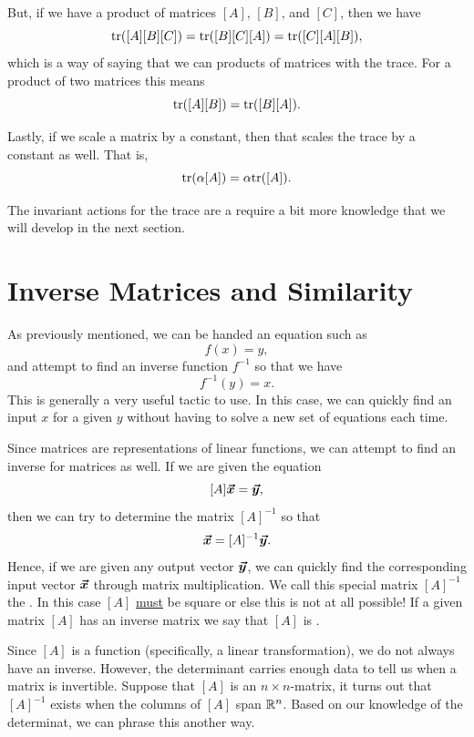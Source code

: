         But, if we have a product of matrices $[A]$, $[B]$, and $[C]$, then we have
        \[
        \mathrm{tr}([A][B][C])=\mathrm{tr}([B][C][A])=\mathrm{tr}([C][A][B]),
        \]
        which is a way of saying that we can  products of matrices with the trace. For a product of two matrices this means
        \[
        \mathrm{tr}([A][B])=\mathrm{tr}([B][A]).
        \]
        
        Lastly, if we scale a matrix by a constant, then that scales the trace by a constant as well. That is,
        \[
        \mathrm{tr}(\alpha[A])=\alpha \mathrm{tr}([A]).
        \]
        
        The invariant actions for the trace are a require a bit more knowledge that we will develop in the next section.
        
    \section{Inverse Matrices and Similarity }
        As previously mentioned, we can be handed an equation such as
        \[
        f(x)=y,
        \]
        and attempt to find an inverse function $f^{-1}$ so that we have
        \[
        f^{-1}(y)=x.
        \]
        This is generally a very useful tactic to use.  In this case, we can quickly find an input $x$ for a given $y$ without having to solve a new set of equations each time.
        
        Since matrices are representations of linear functions, we can attempt to find an inverse for matrices as well.  If we are given the equation
        \[
        [A]\boldsymbol{\boldsymbol{\vec{x}}}=\boldsymbol{\boldsymbol{\vec{y}}},
        \]
        then we can try to determine the matrix $[A]^{-1}$ so that
        \[
        \boldsymbol{\boldsymbol{\vec{x}}} = [A]^{-1}\boldsymbol{\boldsymbol{\vec{y}}}.
        \]
        Hence, if we are given any output vector $\boldsymbol{\boldsymbol{\vec{y}}}$, we can quickly find the corresponding input vector $\boldsymbol{\boldsymbol{\vec{x}}}$ through matrix multiplication. We call this special matrix $[A]^{-1}$ the . In this case $[A]$ \underline{must} be square or else this is not at all possible! If a given matrix $[A]$ has an inverse matrix we say that $[A]$ is .
        
        Since $[A]$ is a function (specifically, a linear transformation), we do not always have an inverse. However, the determinant carries enough data to tell us when a matrix is invertible.  Suppose that $[A]$ is an $n\times n$-matrix, it turns out that $[A]^{-1}$ exists when the columns of $[A]$ span $\mathbb{R}^n$.  Based on our knowledge of the determinat, we can phrase this another way.
        
